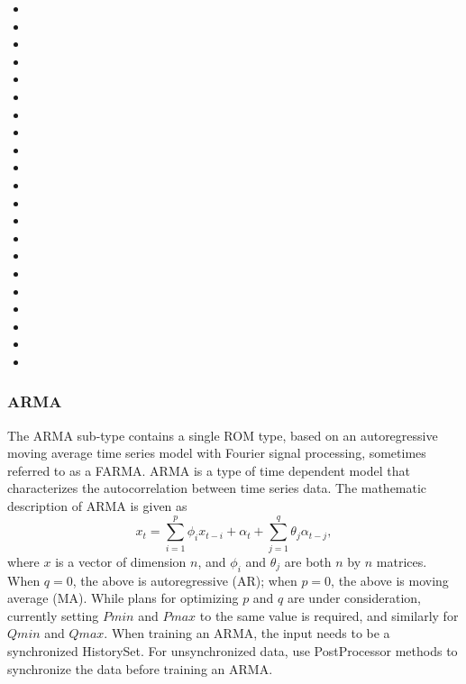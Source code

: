 \begin{itemize}
  \item {}
  \item {}
  \item {}
  \item {}
  \item {}
  \item {}
  \item {}
  \item {}
  \item {}
  \item {}
  \item {}
  \item {}
  \item {}
  \item {}
  \item {}
  \item {}
  \item {}
  \item {}
  \item {}
  \item {}
  \item {}
\end{itemize}

\subsubsection{ARMA}
\label{subsubsec:arma}
The ARMA sub-type contains a single ROM type, based on an autoregressive moving average time series model with
Fourier signal processing, sometimes referred to as a FARMA.
%
ARMA is a type of time dependent model that characterizes the autocorrelation between time series data. The mathematic description of ARMA is given as
\begin{equation*}
x_t = \sum_{i=1}^p\phi_ix_{t-i}+\alpha_t+\sum_{j=1}^q\theta_j\alpha_{t-j},
\end{equation*}
where $x$ is a vector of dimension $n$, and $\phi_i$ and $\theta_j$ are both $n$ by $n$ matrices. When $q=0$, the above is
autoregressive (AR); when $p=0$, the above is moving average (MA).
While plans for optimizing $p$ and $q$ are under consideration, currently setting $Pmin$ and $Pmax$ to the
same value is required, and similarly for $Qmin$ and $Qmax$.
When
training an ARMA, the input needs to be a synchronized HistorySet. For unsynchronized data, use PostProcessor methods to
synchronize the data before training an ARMA.

